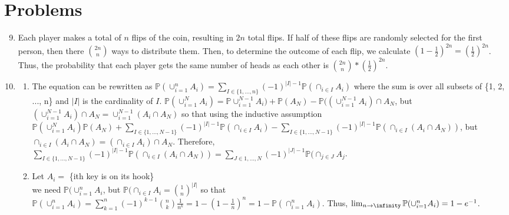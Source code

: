 \documentclass{article}
\begin{document}
\section{Problems}

\begin{enumerate}

    \setcounter{enumi}{8}
    \item 
    
    Each player makes a total of $n$ flips of the coin, resulting in $2n$ total flips. If half of these flips are randomly selected for the first person, then there $\binom{2n}{n}$ ways to distribute them. Then, to determine the outcome of each flip, we calculate $(1-\frac{1}{2})^{2n}=(\frac{1}{2})^{2n}$. Thus, the probability that each player gets the same number of heads as each other is $\binom{2n}{n}*(\frac{1}{2})^{2n}$.
    
    \setcounter{enumi}{13}
    \item 
    
    \begin{enumerate}
        \item 
        
        The equation can be rewritten as $\mathbb{P}(\cup^{n}_{i=1}A_i)=\sum_{I \in \{1, ..., n\}}(-1)^{|I|-1}\mathbb{P}(\cap_{i\in I}A_i)$ where the sum is over all subsets of \{1, 2, ..., n\} and $|I|$ is the cardinality of $I$. $\mathbb{P}(\cup^N_{i=1}A_i)=\mathbb{P}\cup^{N-1}_{i=1}A_i)+\mathbb{P}(A_N)-\mathbb{P}((\cup^{N-1}_{i=1}A_i)\cap A_N$, but $(\cup^{N-1}_{i=1}A_i)\cap A_N = \cup^{N-1}_{i=1}(A_i\cap A_N)$ so that using the inductive assumption $\mathbb{P}(\cup^N_{i=1}A_i)\mathbb{P}(A_N)+\sum_{I\in \{1, ..., N-1\}}(-1)^{|I|-1}\mathbb{P}(\cap_{i\in I}A_i)-\sum_{I\in \{1, ..., N-1\}}(-1)^{|I|-1}\mathbb{P}(\cap_{i\in I}(A_i\cap A_N))$, but $\cap_{i\in I}(A_i\cap A_N)= (\cap_{i\in I} A_i)\cap A_N$. Therefore, $\sum_{I\in \{1, ..., N-1\}}(-1)^{|I|-1}\mathbb{P}(\cap_{i\in I}(A_i\cap A_N))= \sum_{J\in {1, ..., N}}(-1)^{|J|-1}\mathbb{P}(\cap_{j\in J}A_j$. 
        
        \item
        
        Let $A_i = $ \{ith key is on its hook\}\\
        we need $\mathbb{P}(\cup^n_{i=1}A_i$, but $\mathbb{P}(\cap_{i\in I}A_i= \binom{1}{n}^{|I|}$ so that $\mathbb{P}(\cup^n_{i = 1}A_i)=\sum^n_{k=1}(-1)^{k-1}\binom{n}{k}\frac{1}{n^k}=1-(1-\frac{1}{n})^n=1-\mathbb{P}(\cap^n_{i=1}A_i)$. Thus, $\lim_{n\rightarrow \infinity}\mathbb{P}(\cup^n_{i=1}A_i)=1-e^{-1}$.
        

\end{enumerate}
\end{enumerate}
\end{document}
